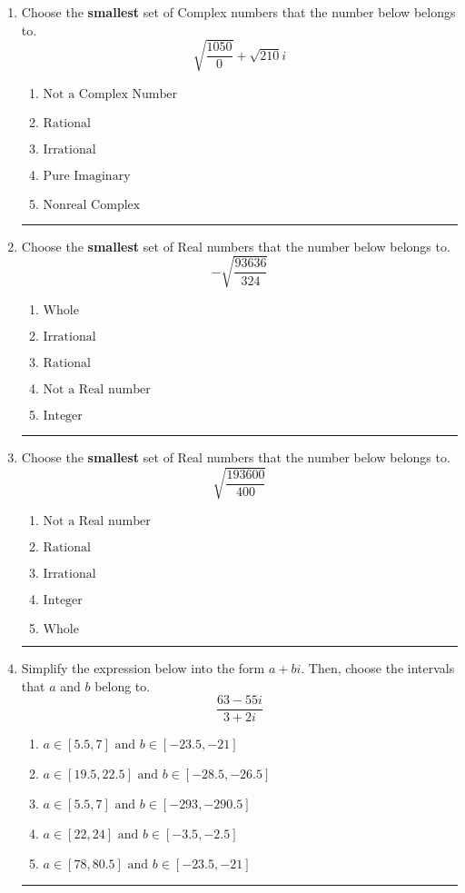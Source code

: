 \documentclass[14pt]{extbook}
\newcommand{\litem}[1]{\item#1\hspace*{-1cm}\rule{\textwidth}{0.4pt}}
\begin{document}
\begin{enumerate}
\litem{
Choose the \textbf{smallest} set of Complex numbers that the number below belongs to.\[ \sqrt{\frac{1050}{0}}+\sqrt{210} i \]\begin{enumerate}[label=\Alph*.]
\item \( \text{Not a Complex Number} \)
\item \( \text{Rational} \)
\item \( \text{Irrational} \)
\item \( \text{Pure Imaginary} \)
\item \( \text{Nonreal Complex} \)

\end{enumerate} }
\litem{
Choose the \textbf{smallest} set of Real numbers that the number below belongs to.\[ -\sqrt{\frac{93636}{324}} \]\begin{enumerate}[label=\Alph*.]
\item \( \text{Whole} \)
\item \( \text{Irrational} \)
\item \( \text{Rational} \)
\item \( \text{Not a Real number} \)
\item \( \text{Integer} \)

\end{enumerate} }
\litem{
Choose the \textbf{smallest} set of Real numbers that the number below belongs to.\[ \sqrt{\frac{193600}{400}} \]\begin{enumerate}[label=\Alph*.]
\item \( \text{Not a Real number} \)
\item \( \text{Rational} \)
\item \( \text{Irrational} \)
\item \( \text{Integer} \)
\item \( \text{Whole} \)

\end{enumerate} }
\litem{
Simplify the expression below into the form $a+bi$. Then, choose the intervals that $a$ and $b$ belong to.\[ \frac{63 - 55 i}{3 + 2 i} \]\begin{enumerate}[label=\Alph*.]
\item \( a \in [5.5, 7] \text{ and } b \in [-23.5, -21] \)
\item \( a \in [19.5, 22.5] \text{ and } b \in [-28.5, -26.5] \)
\item \( a \in [5.5, 7] \text{ and } b \in [-293, -290.5] \)
\item \( a \in [22, 24] \text{ and } b \in [-3.5, -2.5] \)
\item \( a \in [78, 80.5] \text{ and } b \in [-23.5, -21] \)


\end{enumerate}}
\end{enumerate}
\end{document}
